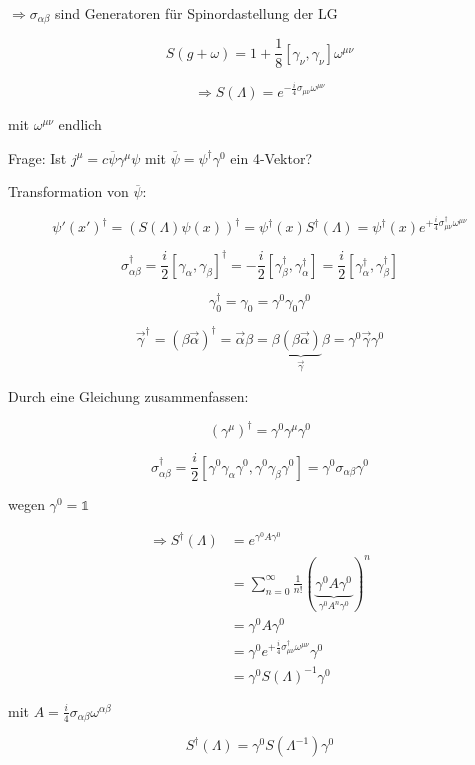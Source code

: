\(\Rightarrow \sigma_{\alpha\beta}\) sind Generatoren für Spinordastellung der LG

\[S(g+\omega) = 1+\frac{1}{8}[\gamma_\nu,\gamma_\nu]\omega^{\mu\nu}\]

\[\Rightarrow S(\Lambda) = e^{-\frac{i}{4}\sigma_{\mu\nu}\omega^{\mu\nu}}\]

mit \(\omega^{\mu\nu}\) endlich

Frage: Ist \(j^\mu = c\overline \psi \gamma^\mu \psi\) mit \(\overline\psi =\psi^\dagger\gamma^0\) ein 4-Vektor?


Transformation von \(\overline \psi\):

\[\psi'(x')^\dagger = (S(\Lambda)\psi(x))^\dagger = \psi^\dagger(x) S^\dagger(\Lambda) = \psi^\dagger(x)e^{+\frac{i}{4}\sigma^\dagger_{\mu\nu}\omega^{\mu\nu}}\]

\[\sigma^\dagger_{\alpha\beta} = \frac{i}{2}[\gamma_\alpha,\gamma_\beta]^\dagger = -\frac{i}{2} [\gamma_\beta^\dagger,\gamma_\alpha^\dagger] = \frac{i}{2}[\gamma_\alpha^\dagger,\gamma_\beta^\dagger] \]


\[\gamma^\dagger_0 = \gamma_0 = \gamma^0\gamma_0\gamma^0\]

\[\vec \gamma^\dagger = (\beta\vec\alpha)^\dagger = \vec\alpha\beta = \beta\underbrace{(\beta\vec\alpha)}_{\vec\gamma}\beta=\gamma^0\vec\gamma\gamma^0\]


Durch eine Gleichung zusammenfassen:

\[(\gamma^\mu)^\dagger = \gamma^0\gamma^\mu\gamma^0\]

\[\sigma^\dagger_{\alpha\beta} = \frac{i}{2}[ \gamma^0\gamma_\alpha\gamma^0, \gamma^0\gamma_\beta\gamma^0] = \gamma^0\sigma_{\alpha\beta}\gamma^0\]

wegen \(\gamma^0=\mathbb 1\)


\begin{align}
\Rightarrow  S^\dagger(\Lambda) &= e^{\gamma^0 A\gamma^0}\\
&=\sum_{n=0}^\infty \frac{1}{n!}(\underbrace{\gamma^0 A \gamma^0}_{\gamma^0 A^n \gamma^0})^n \\
&= \gamma^0 A \gamma^0 \\
&= \gamma^0 e^{+\frac{i}{4}\sigma^\dagger_{\mu\nu}\omega^{\mu\nu}}  \gamma^0 \\
&= \gamma^0 S(\Lambda)^{-1}\gamma^0
\end{align}

mit \(A = \frac{i}{4}\sigma_{\alpha\beta}\omega^{\alpha\beta}\)

\[\boxed{S^\dagger (\Lambda) = \gamma^0S(\Lambda^{-1})\gamma^0 }\]

